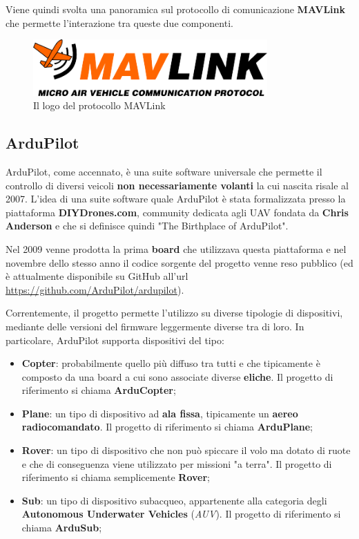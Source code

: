 \documentclass[a4paper, 12pt, oneside]{article}
\begin{document}
Viene quindi svolta una panoramica sul protocollo di comunicazione \textbf{MAVLink} che permette l'interazione tra queste due componenti.

\begin{figure}[H]
    \centering
    \includegraphics[width=0.8\textwidth]{images/logo_mavlink_small.png}
    \caption{Il logo del protocollo MAVLink}
\end{figure}

\newpage

\subsection{ArduPilot}

ArduPilot, come accennato, è una suite software universale che permette il controllo di diversi veicoli \textbf{non necessariamente volanti} \cite{ardupilot} la cui nascita risale al 2007.  L'idea di una suite software quale ArduPilot è stata formalizzata presso la piattaforma \textbf{DIYDrones.com}, community dedicata agli UAV fondata da \textbf{Chris Anderson} e che si definisce quindi "The Birthplace of ArduPilot"\cite{diy-drones}.

Nel 2009 venne prodotta la prima \textbf{board} che utilizzava questa piattaforma e nel novembre dello stesso anno il codice sorgente del progetto venne reso pubblico (ed è attualmente disponibile su GitHub all'url \url{https://github.com/ArduPilot/ardupilot})\cite{ardupilot-history}.

Correntemente, il progetto permette l'utilizzo su diverse tipologie di dispositivi, mediante delle versioni del firmware leggermente diverse tra di loro. In particolare, ArduPilot supporta dispositivi del tipo:

\begin{itemize}
    \item \textbf{Copter}: probabilmente quello più diffuso tra tutti e che tipicamente è composto da una board a cui sono associate diverse \textbf{eliche}. Il progetto di riferimento si chiama \textbf{ArduCopter}\cite{arducopter};
    \item \textbf{Plane}: un tipo di dispositivo ad \textbf{ala fissa}, tipicamente un \textbf{aereo radiocomandato}. Il progetto di riferimento si chiama \textbf{ArduPlane}\cite{arduplane};
    \item \textbf{Rover}: un tipo di dispositivo che non può spiccare il volo ma dotato di ruote e che di conseguenza viene utilizzato per missioni "a terra". Il progetto di riferimento si chiama semplicemente \textbf{Rover}\cite{rover};
    \item \textbf{Sub}: un tipo di dispositivo subacqueo, appartenente alla categoria degli \textbf{Autonomous Underwater Vehicles} (\textit{AUV}). Il progetto di riferimento si chiama \textbf{ArduSub}\cite{ardusub};
\end{itemize}
\end{document}
